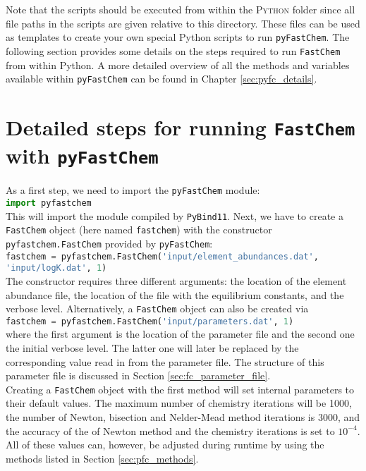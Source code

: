 \documentclass[numbers=noenddot]{aux/fcmanual}
\newcommand{\fc}{\texttt{FastChem}\xspace}
\newcommand{\pfc}{\texttt{pyFastChem}\xspace}
\newcommand{\pb}{\texttt{PyBind11}\xspace}
\begin{document}
Note that the scripts should be executed from within the \textsc{Python} folder since all file paths in the scripts are given relative to this directory.
These files can be used as templates to create your own special Python scripts to run \pfc. The following section provides some details on the steps required to run \fc from within Python. A more detailed overview of all the methods and variables available within \pfc can be found in Chapter \ref{sec:pyfc_details}.


\section{Detailed steps for running \fc with \pfc}

As a first step, we need to import the \pfc module:\\

\lstinline[language=Python]!import pyfastchem!\\

This will import the module compiled by \pb. Next, we have to create a \fc object (here named \lstinline[language=Python]!fastchem!) with the constructor \lstinline[language=Python]!pyfastchem.FastChem! provided by \pfc:\\

\lstinline[language=Python]!fastchem = pyfastchem.FastChem('input/element_abundances.dat', 'input/logK.dat', 1)!\\

The constructor requires three different arguments: the location of the element abundance file, the location of the file with the equilibrium constants, and the verbose level. Alternatively, a \fc object can also be created via\\

\lstinline[language=Python]!fastchem = pyfastchem.FastChem('input/parameters.dat', 1)!\\

where the first argument is the location of the parameter file and the second one the initial verbose level. The latter one will later be replaced by the corresponding value read in from the parameter file. The structure of this parameter file is discussed in Section \ref{sec:fc_parameter_file}.\\

Creating a \fc object with the first method will set internal parameters to their default values. The maximum number of chemistry iterations will be 1000, the number of Newton, bisection and Nelder-Mead method iterations is 3000, and the accuracy of the of Newton method and the chemistry iterations is set to $10^{-4}$. All of these values can, however, be adjusted during runtime by using the methods listed in Section \ref{sec:pfc_methods}.\\
\end{document}
